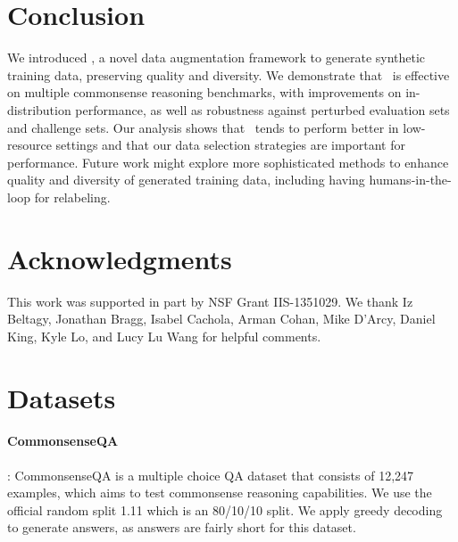 \documentclass[11pt,a4paper]{article}
\newcommand{\gdaug}{}
\begin{document}
 \section{Conclusion}
\label{sec:conclusion}

We introduced \gdaug, a novel data augmentation framework to generate synthetic training data, preserving quality and diversity. We demonstrate that \gdaug\ is effective on multiple commonsense reasoning benchmarks, with improvements on in-distribution performance, as well as robustness against perturbed evaluation sets and challenge sets. 
Our analysis shows that \gdaug\ tends to perform better in low-resource settings and that our data selection strategies are important for performance.
Future work might explore more sophisticated methods to enhance quality and diversity of generated training data, including having humans-in-the-loop for relabeling.
 \section*{Acknowledgments}
This work was supported in part by NSF Grant IIS-1351029.  We thank Iz Beltagy, Jonathan Bragg, Isabel Cachola, Arman Cohan, Mike D'Arcy, Daniel King, Kyle Lo, and Lucy Lu Wang for helpful comments. 



\clearpage
\newpage
\clearpage
\appendix

\section{Datasets}
\label{app:datasets}


\paragraph{CommonsenseQA} \cite{talmor-etal-2019-commonsenseqa}: CommonsenseQA is a multiple choice QA dataset that consists of 12,247 examples, which aims to test commonsense reasoning capabilities. We use the official random split 1.11 which is an 80/10/10
split. We apply greedy decoding to generate answers, as answers are fairly short for this dataset. 
\end{document}

